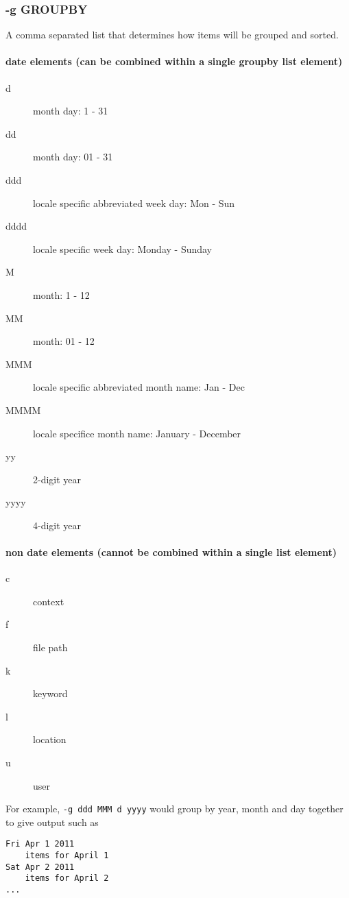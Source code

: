 \documentclass[]{article}
\begin{document}
\subsubsection{-g GROUPBY}

A comma separated list that determines how items will be grouped and
sorted.

\paragraph{date elements (can be combined within a single groupby list
element)}

\begin{description}
\item[d]
month day: 1 - 31
\item[dd]
month day: 01 - 31
\item[ddd]
locale specific abbreviated week day: Mon - Sun
\item[dddd]
locale specific week day: Monday - Sunday
\item[M]
month: 1 - 12
\item[MM]
month: 01 - 12
\item[MMM]
locale specific abbreviated month name: Jan - Dec
\item[MMMM]
locale specifice month name: January - December
\item[yy]
2-digit year
\item[yyyy]
4-digit year
\end{description}

\paragraph{non date elements (cannot be combined within a single list
element)}

\begin{description}
\item[c]
context
\item[f]
file path
\item[k]
keyword
\item[l]
location
\item[u]
user
\end{description}

For example, \texttt{-g ddd MMM d yyyy} would group by year, month and
day together to give output such as

\begin{verbatim}
Fri Apr 1 2011
    items for April 1
Sat Apr 2 2011
    items for April 2
...
\end{verbatim}
\end{document}
